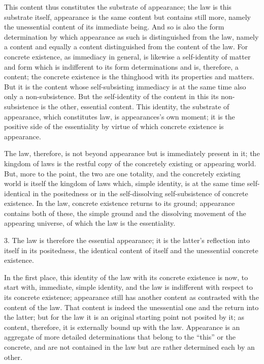 This content thus constitutes the substrate of appearance;
the law is this substrate itself,
appearance is the same content but contains still more,
namely the unessential content of its immediate being.
And so is also the form determination by which
appearance as such is distinguished from the law,
namely a content and equally a content distinguished
from the content of the law.
For concrete existence, as immediacy in general,
is likewise a self-identity of matter and form
which is indifferent to its form determinations
and is, therefore, a content;
the concrete existence is the thinghood
with its properties and matters.
But it is the content whose self-subsisting immediacy is
at the same time also only a non-subsistence.
But the self-identity of the content
in this its non-subsistence
is the other, essential content.
This identity, the substrate of appearance,
which constitutes law,
is appearances's own moment;
it is the positive side of the essentiality
by virtue of which concrete existence is appearance.

The law, therefore, is not beyond appearance
but is immediately present in it;
the kingdom of laws is the restful copy
of the concretely existing or appearing world.
But, more to the point, the two are one totality,
and the concretely existing world is itself
the kingdom of laws which, simple identity,
is at the same time self-identical in the positedness
or in the self-dissolving self-subsistence of concrete existence.
In the law, concrete existence returns to its ground;
appearance contains both of these, the simple ground
and the dissolving movement of the appearing universe,
of which the law is the essentiality.

3. The law is therefore the essential appearance;
it is the latter's reflection into itself in its positedness,
the identical content of itself and the unessential concrete existence.

In the first place, this identity of the law
with its concrete existence is now, to start with,
immediate, simple identity, and the law is indifferent
with respect to its concrete existence;
appearance still has another content as
contrasted with the content of the law.
That content is indeed the unessential one
and the return into the latter;
but for the law it is an original starting point not posited by it;
as content, therefore, it is externally bound up with the law.
Appearance is an aggregate of more detailed determinations
that belong to the “this” or the concrete,
and are not contained in the law
but are rather determined each by an other.


